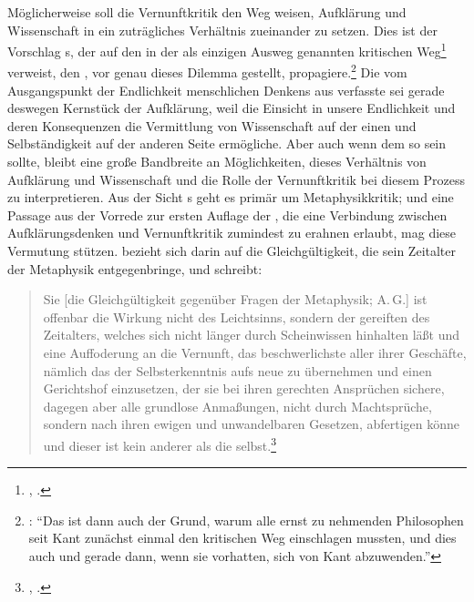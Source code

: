 Möglicherweise soll die Vernunftkritik den Weg weisen, Aufklärung und Wissenschaft in ein
zuträgliches Verhältnis zueinander zu setzen. Dies ist der Vorschlag
s, der auf den in der  als einzigen Ausweg genannten kritischen
Weg\footnote{\cite[Vgl.][B~884]{Kant:KritikderreinenVernunft2003},
\cite[III: 552.19]{Kant:GesammelteWerke1900ff.}.} verweist, den , vor
genau dieses Dilemma gestellt,
propagiere.\footnote{\cite[Vgl.][837]{Schnaedelbach:WirKantianer2005}:
  \enquote{Das ist dann auch der Grund, warum alle ernst zu nehmenden
    Philosophen seit Kant zunächst einmal den kritischen Weg
    einschlagen mussten, und dies auch und gerade dann, wenn sie
    vorhatten, sich von Kant abzuwenden.}} Die vom Ausgangspunkt der
Endlichkeit menschlichen Denkens aus verfasste  sei gerade deswegen Kernstück der Aufklärung, weil die Einsicht in
unsere Endlichkeit und deren Konsequenzen die Vermittlung von Wissenschaft auf
der einen und Selbständigkeit auf der anderen Seite ermögliche. Aber auch wenn
dem so sein sollte, bleibt eine große Bandbreite an Möglichkeiten, dieses
Verhältnis von Aufklärung und Wissenschaft und die Rolle der Vernunftkritik bei
diesem Prozess zu interpretieren. Aus der Sicht s geht es
primär um Metaphysikkritik; und eine Passage aus der Vorrede zur ersten Auflage
der , die eine Verbindung zwischen
Aufklärungsdenken und Vernunftkritik zumindest zu erahnen erlaubt, mag diese
Vermutung stützen.  bezieht sich darin auf die Gleichgültigkeit, die
sein Zeitalter der Metaphysik entgegenbringe, und schreibt:
\begin{quote}
  Sie [die Gleichgültigkeit gegenüber Fragen der Metaphysik; A.\,G.] ist
  offenbar die Wirkung nicht des Leichtsinns, sondern der gereiften
   des Zeitalters, welches sich nicht länger durch
  Scheinwissen hinhalten läßt und eine Auffoderung an die Vernunft, das
  beschwerlichste aller ihrer Geschäfte, nämlich das der Selbsterkenntnis aufs
  neue zu übernehmen und einen Gerichtshof einzusetzen, der sie bei ihren
  gerechten Ansprüchen sichere, dagegen aber alle grundlose Anmaßungen, nicht
  durch Machtsprüche, sondern nach ihren ewigen und unwandelbaren Gesetzen,
  abfertigen könne und dieser ist kein anderer als die  selbst.\footnote{\cite[][A xi-xii]{Kant:KritikderreinenVernunft2003},
  \cite[][IV: 9.1--10]{Kant:GesammelteWerke1900ff.}.}
\end{quote}
